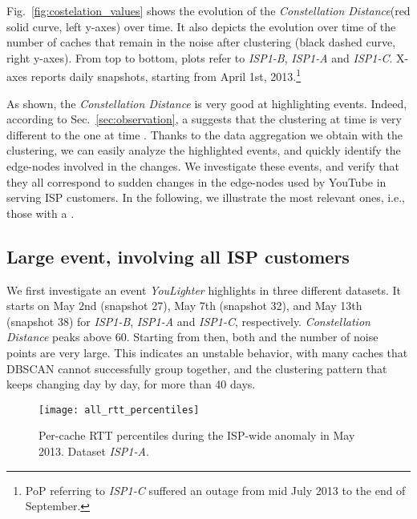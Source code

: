\documentclass{acm_proc_article-sp}
\newcommand{\tool}{\textit{YouLighter}\xspace}
\newcommand{\distance}{\textit{Constellation Distance}\xspace}
\newcommand{\nodes}{{edge-nodes}\xspace}
\newcommand{\TApub}{\textit{ISP1-A}\xspace}
\newcommand{\TApri}{\textit{ISP1-B}\xspace}
\newcommand{\TBpub}{\textit{ISP1-C}\xspace}
\begin{document}
Fig.~\ref{fig:costelation_values} shows the evolution of the \distance (red solid curve, left y-axes) over time. It also depicts the evolution over time of the number of caches that remain in the noise after clustering (black dashed curve, right y-axes). From top to bottom, plots refer to \TApri, \TApub and \TBpub. X-axes reports daily snapshots, starting from April 1st, 2013.\footnote{PoP referring to \TBpub suffered an outage from mid July 2013 to the end of September.}

As shown, the \distance is very good at highlighting events. 
Indeed, according to Sec.~\ref{sec:observation}, a  suggests that the clustering at time  is very different to the one at time . Thanks to the data aggregation we obtain with the clustering, we can easily analyze the highlighted events, and quickly identify the edge-nodes involved in the changes. We investigate these events, and verify that they all correspond to sudden changes in the \nodes used by YouTube in serving ISP customers. In the following, we illustrate the most relevant ones, i.e., those with a .



\subsection{Large event, involving all ISP customers}
We first investigate an event \tool highlights in three different datasets. It starts on May 2nd (snapshot 27), May 7th (snapshot 32), and May 13th (snapshot 38) for \TApri, \TApub and \TBpub, respectively. \distance peaks above 60. Starting from then, both  and the number of noise points are very large. This indicates an unstable behavior, with many caches that DBSCAN cannot successfully group together, and the clustering pattern that keeps changing day by day, for more than 40 days.

\begin{figure}[t!]
\centering
\texttt{[image: all\_rtt\_percentiles]}
\caption{Per-cache RTT percentiles during the ISP-wide anomaly in May 2013. Dataset \TApub.}
    \label{fig:percAnom}
\end{figure}
\end{document}
